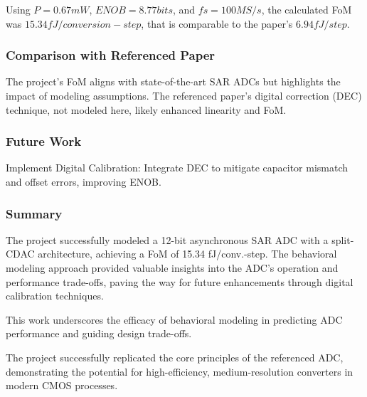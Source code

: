 Using $P = 0.67 mW$, $ENOB = 8.77 bits$, and $fs = 100MS/s$, the calculated FoM was $15.34 fJ/conversion-step$, that is comparable to the paper's $6.94 fJ/step$.

\subsubsection{Comparison with Referenced Paper}

    The project's FoM aligns with state-of-the-art SAR ADCs but highlights the impact of modeling assumptions. The referenced paper's digital correction (DEC) technique, not modeled here, likely enhanced linearity and FoM.

\subsubsection{Future Work}

Implement Digital Calibration: Integrate DEC to mitigate capacitor mismatch and offset errors, improving ENOB.

\subsubsection{Summary}
The project successfully modeled a 12-bit asynchronous SAR ADC with a split-CDAC architecture, achieving a FoM of 15.34 fJ/conv.-step. The behavioral modeling approach provided valuable insights into the ADC's operation and performance trade-offs, paving the way for future enhancements through digital calibration techniques.

This work underscores the efficacy of behavioral modeling in predicting ADC performance and guiding design trade-offs. 

The project successfully replicated the core principles of the referenced ADC, demonstrating the potential for high-efficiency, medium-resolution converters in modern CMOS processes. 